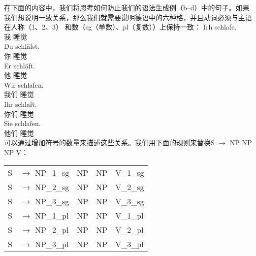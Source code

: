 
在下面的内容中，我们将思考如何防止我们的语法生成例（b--d）中的句子。如果我们想说明一致关系，那么我们就需要说明德语中的六种格，并且动词必须与主语在人称（1、2、3） 和数（sg（单数）、pl（复数））上保持一致：
\eal\jamwidth=8cm\relax%
\ex 
\gll Ich schlafe.\\
     我 睡觉\\      
\ex 
\gll Du schläfst.\\
     你 睡觉\\      
\ex 
\gll Er schläft.\\
     他 睡觉\\      
\ex 
\gll Wir schlafen.\\
     我们 睡觉\\       
\ex 
\gll Ihr schlaft.\\
     你们 睡觉\\       
\ex 
\gll Sie schlafen.\\   
     他们 睡觉\\      
\zl
可以通过增加符号的数量来描述这些关系。我们用下面的规则来替换S $\to$ NP NP NP V：
\ea
\begin{tabular}[t]{@{}l@{ }l@{~~}l@{~~}l@{~~}l}
S  & $\to$ NP\_1\_sg & NP & NP & V\_1\_sg\\
S  & $\to$ NP\_2\_sg & NP & NP & V\_2\_sg\\
S  & $\to$ NP\_3\_sg & NP & NP & V\_3\_sg\\
S  & $\to$ NP\_1\_pl & NP & NP & V\_1\_pl\\
S  & $\to$ NP\_2\_pl & NP & NP & V\_2\_pl\\
S  & $\to$ NP\_3\_pl & NP & NP & V\_3\_pl\\
\end{tabular}
